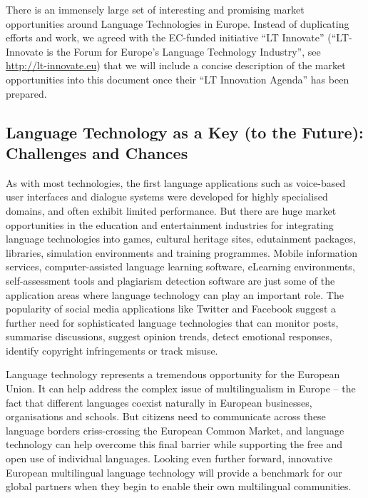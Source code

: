 \documentclass[10pt, plain]{../../metanetpaper}
\begin{document}
\begin{multicols}{2}
There is an immensely large set of interesting and promising market opportunities around Language Technologies in Europe. Instead of duplicating efforts and work, we agreed with the EC-funded initiative ``LT Innovate'' (``LT-Innovate is the Forum for Europe's Language Technology Industry'', see \url{http://lt-innovate.eu}) that we will include a concise description of the market opportunities into this document once their ``LT Innovation Agenda'' has been prepared.

\subsection{Language Technology as a Key (to the Future): Challenges and Chances }
\label{sec:lang-techn-as-a-key-to-the-future}


As with most technologies, the first language applications such as voice-based user interfaces and dialogue systems were developed for highly specialised domains, and often exhibit limited performance. But there are huge market opportunities in the education and entertainment industries for integrating language technologies into games, cultural heritage sites, edutainment packages, libraries, simulation environments and training programmes. Mobile information services, computer-assisted language learning software, eLearning environments, self-assessment tools and plagiarism detection software are just some of the application areas where language technology can play an important role. The popularity of social media applications like Twitter and Facebook suggest a further need for sophisticated language technologies that can monitor posts, summarise discussions, suggest opinion trends, detect emotional responses, identify copyright infringements or track misuse.

Language technology represents a tremendous opportunity for the European Union. It can help address the complex issue of multilingualism in Europe – the fact that different languages coexist naturally in European businesses, organisations and schools. But citizens need to communicate across these language borders criss-crossing the European Common Market, and language technology can help overcome this final barrier while supporting the free and open use of individual languages. Looking even further forward, innovative European multilingual language technology will provide a benchmark for our global partners when they begin to enable their own multilingual communities. 


\end{multicols}
\end{document}

